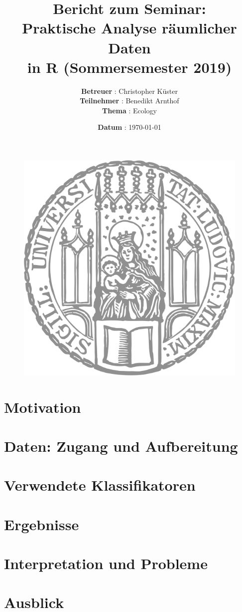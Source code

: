\documentclass[12pt, titlepage]{article}
\title{\textbf{Bericht zum Seminar:\\[1cm]Praktische Analyse räumlicher Daten \\in R (Sommersemester 2019)}}
\author{\textbf{Betreuer} : Christopher Küster\\[1em] \textbf{Teilnehmer} : Benedikt Arnthof \\ [1em] \textbf{Thema} : Ecology}
\date{\textbf{Datum} : \today}
\begin{document}
\begin{figure}
   \centering
  \includegraphics[width = 0.4\linewidth]{Figures/Sigillum_new.png}
\end{figure}

\maketitle
\nopagebreak
\begin{abstract}
\label{section: Abstract}
    
\end{abstract}

\tableofcontents
\newpage

\section{Motivation}
\label{section:Motivation}
    
\newpage

\section{Daten: Zugang und Aufbereitung}
\label{section:Datenaufbereitung}
    
\newpage

\section{Verwendete Klassifikatoren}
\label{section:Theorie}

\newpage

\section{Ergebnisse}

\label{section:Ergebnisse}

\newpage

\section{Interpretation und Probleme}
\label{section:5}

\newpage

\section{Ausblick}
\label{section:Ausblick}

\newpage

\sloppy
\printbibliography

\newpage
\listoffigures
\newpage
\listoftables
\end{document}
